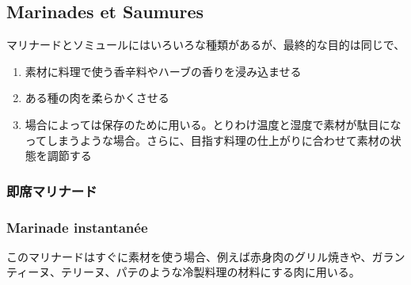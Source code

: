 \hypertarget{marinades-et-saumures}{%
\subsection{Marinades et Saumures}\label{marinades-et-saumures}}

マリナードとソミュールにはいろいろな種類があるが、最終的な目的は同じで、

\begin{enumerate}
\def\labelenumi{\arabic{enumi}.}
\item
  素材に料理で使う香辛料やハーブの香りを浸み込ませる
\item
  ある種の肉を柔らかくさせる
\item
  場合によっては保存のために用いる。とりわけ温度と湿度で素材が駄目になってしまうような場合。さらに、目指す料理の仕上がりに合わせて素材の状態を調節する
\end{enumerate}
\begin{recette}
\hypertarget{ux5373ux5e2dux30deux30eaux30caux30fcux30c9}{%
\subsubsection{即席マリナード}\label{ux5373ux5e2dux30deux30eaux30caux30fcux30c9}}

\hypertarget{marinade-instantanuxe9e}{%
\subsubsection{Marinade instantanée}\label{marinade-instantanuxe9e}}

このマリナードはすぐに素材を使う場合、例えば赤身肉のグリル焼きや、ガランティーヌ、テリーヌ、パテのような冷製料理の材料にする肉に用いる。
\end{recette}
